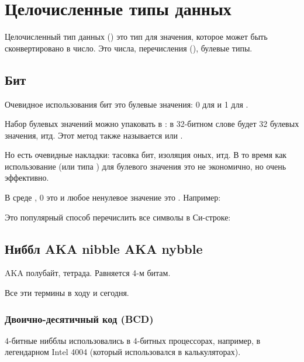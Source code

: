 \section{Целочисленные типы данных}

Целочисленный тип данных () это тип для значения, которое может быть сконвертировано в число.
Это числа, перечисления (), булевые типы.

\subsection{Бит}

Очевидное использования бит это булевые значения: 0 для  и 1 для .

Набор булевых значений можно упаковать в : в 32-битном слове будет 32 булевых значения, итд.
Этот метод также называется  или .

Но есть очевидные накладки: тасовка бит, изоляция оных, итд.
В то время как использование  (или типа ) для булевого значения это не экономично,
но очень эффективно.

В среде \CCpp, 0 это  и любое ненулевое значение это .
Например:



Это популярный способ перечислить все символы в Си-строке:



\subsection{Ниббл AKA nibble AKA nybble}

\ac{AKA} полубайт, тетрада.
Равняется 4-м битам.

Все эти термины в ходу и сегодня.

\subsubsection{Двоично-десятичный код (\ac{BCD})}
\label{BCD}


4-битные нибблы использовались в 4-битных процессорах, например, в легендарном Intel 4004 (который использовался в
калькуляторах).

